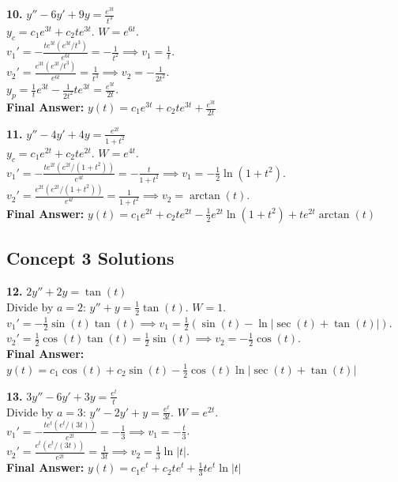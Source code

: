 \documentclass[11pt]{article}
\begin{document}
\vspace{0.5cm}
\textbf{10.} $y'' - 6y' + 9y = \frac{e^{3t}}{t^3}$ \\
$y_c = c_1e^{3t} + c_2te^{3t}$. $W = e^{6t}$. \\
$v_1' = -\frac{te^{3t}(e^{3t}/t^3)}{e^{6t}} = -\frac{1}{t^2} \implies v_1 = \frac{1}{t}$. \\
$v_2' = \frac{e^{3t}(e^{3t}/t^3)}{e^{6t}} = \frac{1}{t^3} \implies v_2 = -\frac{1}{2t^2}$. \\
$y_p = \frac{1}{t}e^{3t} - \frac{1}{2t^2}te^{3t} = \frac{e^{3t}}{2t}$. \\
\textbf{Final Answer:} $y(t) = c_1e^{3t} + c_2te^{3t} + \frac{e^{3t}}{2t}$

\vspace{0.5cm}
\textbf{11.} $y'' - 4y' + 4y = \frac{e^{2t}}{1+t^2}$ \\
$y_c = c_1e^{2t} + c_2te^{2t}$. $W = e^{4t}$. \\
$v_1' = -\frac{te^{2t}(e^{2t}/(1+t^2))}{e^{4t}} = -\frac{t}{1+t^2} \implies v_1 = -\frac{1}{2}\ln(1+t^2)$. \\
$v_2' = \frac{e^{2t}(e^{2t}/(1+t^2))}{e^{4t}} = \frac{1}{1+t^2} \implies v_2 = \arctan(t)$. \\
\textbf{Final Answer:} $y(t) = c_1e^{2t} + c_2te^{2t} - \frac{1}{2}e^{2t}\ln(1+t^2) + te^{2t}\arctan(t)$

\subsection*{Concept 3 Solutions}
\textbf{12.} $2y'' + 2y = \tan(t)$ \\
Divide by $a=2$: $y'' + y = \frac{1}{2}\tan(t)$. $W = 1$. \\
$v_1' = -\frac{1}{2}\sin(t)\tan(t) \implies v_1 = \frac{1}{2}(\sin(t) - \ln|\sec(t) + \tan(t)|)$. \\
$v_2' = \frac{1}{2}\cos(t)\tan(t) = \frac{1}{2}\sin(t) \implies v_2 = -\frac{1}{2}\cos(t)$. \\
\textbf{Final Answer:} $y(t) = c_1\cos(t) + c_2\sin(t) - \frac{1}{2}\cos(t)\ln|\sec(t) + \tan(t)|$

\vspace{0.5cm}
\textbf{13.} $3y'' - 6y' + 3y = \frac{e^t}{t}$ \\
Divide by $a=3$: $y'' - 2y' + y = \frac{e^t}{3t}$. $W = e^{2t}$. \\
$v_1' = -\frac{te^t(e^t/(3t))}{e^{2t}} = -\frac{1}{3} \implies v_1 = -\frac{t}{3}$. \\
$v_2' = \frac{e^t(e^t/(3t))}{e^{2t}} = \frac{1}{3t} \implies v_2 = \frac{1}{3}\ln|t|$. \\
\textbf{Final Answer:} $y(t) = c_1e^t + c_2te^t + \frac{1}{3}te^t\ln|t|$
\end{document}
